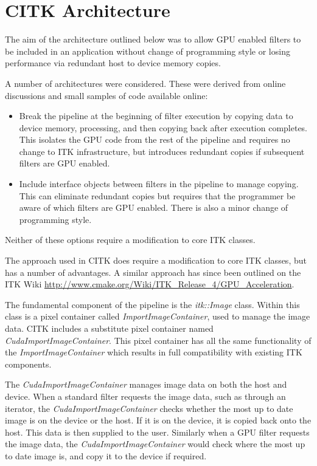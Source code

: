 \documentclass{InsightArticle}
\begin{document}
\section{CITK Architecture}
The aim of the architecture outlined below was to allow GPU enabled
filters to be included in an application without change of programming
style or losing performance via redundant host to device memory copies. 

A number of architectures were considered. These were derived from
online discussions and small samples of code available online:
\begin{itemize}
\item Break the pipeline at the beginning of filter execution by
  copying data to device memory, processing, and then copying back
  after execution completes. This isolates the GPU code from the rest
  of the pipeline and requires no change to ITK infrastructure, but
  introduces redundant copies if subsequent filters are GPU enabled.
\item Include interface objects between filters in the pipeline to
  manage copying. This can eliminate redundant copies but requires
  that the programmer be aware of which filters are GPU enabled. There
  is also a minor change of programming style.
\end{itemize}

Neither of these options require a modification to core ITK classes.

The approach used in CITK does require a modification to core ITK
classes, but has a number of advantages. A similar approach has since
been outlined on the ITK Wiki \url{http://www.cmake.org/Wiki/ITK\_Release\_4/GPU\_Acceleration}.

The fundamental component of the pipeline is the {\em itk::Image}
class. Within this class is a pixel container called {\em
  ImportImageContainer}, used to manage the image data. CITK includes
a substitute pixel container named {\em
  CudaImportImageContainer}. This pixel container has all the same
functionality of the {\em ImportImageContainer} which results in full
compatibility with existing ITK components.

The {\em CudaImportImageContainer} manages image data on both the host
and device. When a standard filter requests the image data, such as
through an iterator, the {\em CudaImportImageContainer} checks whether
the most up to date image is on the device or the host. If it is on
the device, it is copied back onto the host. This data is then
supplied to the user. Similarly when a GPU filter requests the image
data, the {\em CudaImportImageContainer} would check where the most up
to date image is, and copy it to the device if required.
\end{document}
